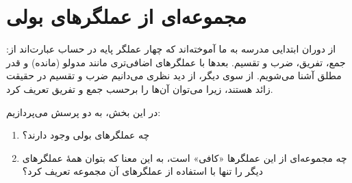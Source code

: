 \section*{ مجموعه‌ای از عملگرهای بولی}

      از دوران ابتدایی مدرسه به ما آموخته‌اند که چهار عملگر پایه در حساب عبارت‌اند از: جمع، تفریق، ضرب و تقسیم. بعدها با عملگرهای اضافی‌تری مانند مدولو (مانده) و قدر مطلق آشنا می‌شویم. از سوی دیگر، از دید نظری می‌دانیم ضرب و تقسیم در حقیقت زائد هستند، زیرا می‌توان آن‌ها را برحسب جمع و تفریق تعریف کرد.
      
      در این بخش، به دو پرسش می‌پردازیم:
      \begin{enumerate}
        \item چه عملگرهای بولی وجود دارند؟
        \item چه مجموعه‌ای از این عملگرها «کافی» است، به این معنا که بتوان همهٔ عملگرهای دیگر را تنها با استفاده از عملگرهای آن مجموعه تعریف کرد؟
      \end{enumerate}


